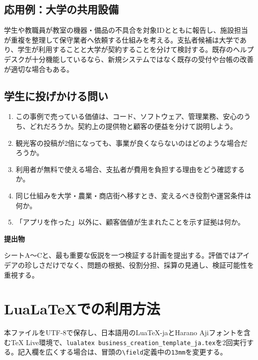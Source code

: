 \documentclass[a4paper,11pt]{ltjsarticle}
\newcommand{\lead}[1]{\noindent\textcolor{accent}{\textbf{#1}}\par}
\begin{document}
\subsection{応用例：大学の共用設備}
学生や教職員が教室の機器・備品の不具合を対象IDとともに報告し、施設担当が重複を整理して保守業者へ依頼する仕組みを考える。支払者候補は大学であり、学生が利用することと大学が契約することを分けて検討する。既存のヘルプデスクが十分機能しているなら、新規システムではなく既存の受付や台帳の改善が適切な場合もある。

\subsection{学生に投げかける問い}
\begin{enumerate}
\item この事例で売っている価値は、コード、ソフトウェア、管理業務、安心のうち、どれだろうか。契約上の提供物と顧客の便益を分けて説明しよう。
\item 観光客の投稿が2倍になっても、事業が良くならないのはどのような場合だろうか。
\item 利用者が無料で使える場合、支払者が費用を負担する理由をどう確認するか。
\item 同じ仕組みを大学・農業・商店街へ移すとき、変えるべき役割や運営条件は何か。
\item 「アプリを作った」以外に、顧客価値が生まれたことを示す証拠は何か。
\end{enumerate}

\lead{提出物}
シートA～Cと、最も重要な仮説を一つ検証する計画を提出する。評価ではアイデアの珍しさだけでなく、問題の根拠、役割分担、採算の見通し、検証可能性を重視する。

\section*{LuaLaTeXでの利用方法}
本ファイルをUTF-8で保存し、日本語用のLuaTeX-jaとHarano Ajiフォントを含むTeX Live環境で、\texttt{lualatex business\_creation\_template\_ja.tex}を2回実行する。記入欄を広くする場合は、冒頭の\texttt{\textbackslash field}定義中の\texttt{13mm}を変更する。
\end{document}
